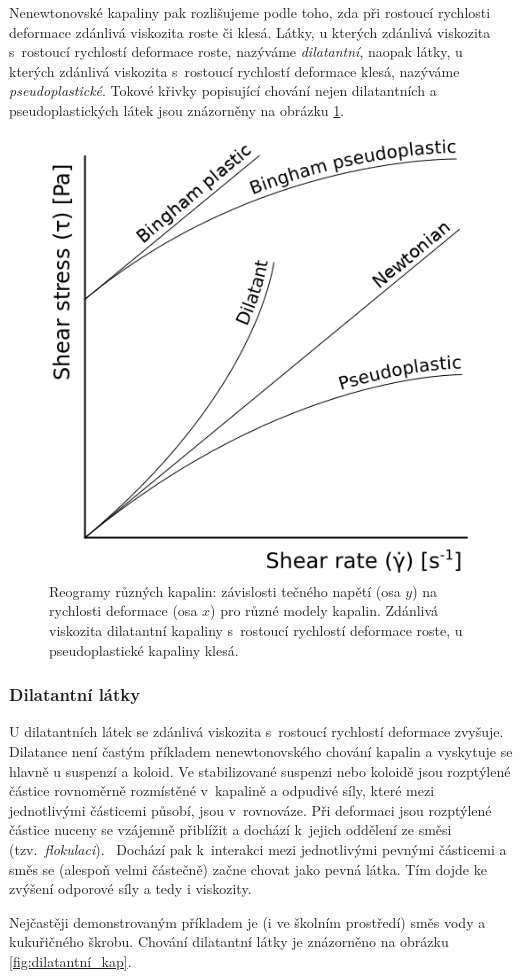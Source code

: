 \documentclass[12pt]{article}
\begin{document}
\par
Nenewtonovské kapaliny pak rozlišujeme podle toho, zda při rostoucí rychlosti deformace zdánlivá viskozita roste či klesá. Látky, u kterých zdánlivá viskozita s~rostoucí rychlostí deformace roste, nazýváme \emph{dilatantní}, naopak látky, u kterých zdánlivá viskozita s~rostoucí rychlostí deformace klesá, nazýváme \emph{pseudoplastické}. Tokové křivky popisující chování nejen dilatantních a pseudoplastických látek jsou znázorněny na obrázku \ref{fig:rheology_diagram}.

\begin{figure}
    \centering
    \includegraphics[width = 0.5\linewidth]{figures/Rheology_of_time_independent_fluids.png}
    \caption{Reogramy různých kapalin: závislosti tečného napětí (osa $y$) na rychlosti deformace (osa $x$) pro různé modely kapalin. Zdánlivá viskozita dilatantní kapaliny s~rostoucí rychlostí deformace roste, u pseudoplastické kapaliny klesá.~\cite{Figure:rheology_diagram}}
    \label{fig:rheology_diagram}
\end{figure}

\subsubsection{Dilatantní látky}%

U dilatantních látek se zdánlivá viskozita s~rostoucí rychlostí deformace zvyšuje. Dilatance není častým příkladem nenewtonovského chování kapalin a vyskytuje se hlavně u suspenzí a koloid. Ve stabilizované suspenzi nebo koloidě jsou rozptýlené částice rovnoměrně rozmístěné v~kapalině a odpudivé síly, které mezi jednotlivými částicemi působí, jsou v~rovnováze. Při deformaci jsou rozptýlené částice nuceny se vzájemně přiblížit a dochází k~jejich oddělení ze směsi (tzv.~\emph{flokulaci}).~\cite{wiki:Flocculation}\cite{prez:teorie_koagulace} Dochází pak k~interakci mezi jednotlivými pevnými částicemi a směs se (alespoň velmi částečně) začne chovat jako pevná látka. Tím dojde ke zvýšení odporové síly a tedy i viskozity.~\cite{wiki:Dilatant}
\par
Nejčastěji demonstrovaným příkladem je (i ve školním prostředí) směs vody a kukuřičného škrobu. Chování dilatantní látky je znázorněno na obrázku \ref{fig:dilatantní_kap}.
\end{document}
